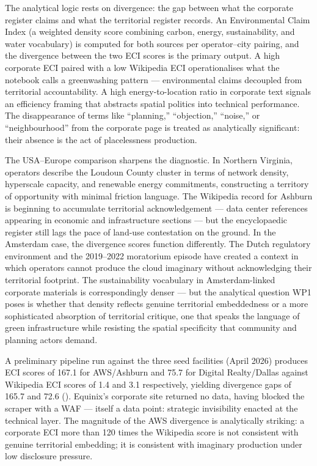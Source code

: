 The analytical logic rests on divergence: the gap between what the corporate register claims and what the territorial register records. An Environmental Claim Index (a weighted density score combining carbon, energy, sustainability, and water vocabulary) is computed for both sources per operator–city pairing, and the divergence between the two ECI scores is the primary output. A high corporate ECI paired with a low Wikipedia ECI operationalises what the notebook calls a greenwashing pattern — environmental claims decoupled from territorial accountability. A high energy-to-location ratio in corporate text signals an efficiency framing that abstracts spatial politics into technical performance. The disappearance of terms like ``planning,'' ``objection,'' ``noise,'' or ``neighbourhood'' from the corporate page is treated as analytically significant: their absence is the act of placelessness production.

The USA--Europe comparison sharpens the diagnostic. In Northern Virginia, operators describe the Loudoun County cluster in terms of network density, hyperscale capacity, and renewable energy commitments, constructing a territory of opportunity with minimal friction language. The Wikipedia record for Ashburn is beginning to accumulate territorial acknowledgement — data center references appearing in economic and infrastructure sections — but the encyclopaedic register still lags the pace of land-use contestation on the ground. In the Amsterdam case, the divergence scores function differently. The Dutch regulatory environment and the 2019--2022 moratorium episode have created a context in which operators cannot produce the cloud imaginary without acknowledging their territorial footprint. The sustainability vocabulary in Amsterdam-linked corporate materials is correspondingly denser — but the analytical question WP1 poses is whether that density reflects genuine territorial embeddedness or a more sophisticated absorption of territorial critique, one that speaks the language of green infrastructure while resisting the spatial specificity that community and planning actors demand.

A preliminary pipeline run against the three seed facilities (April 2026) produces ECI scores of 167.1 for AWS/Ashburn and 75.7 for Digital Realty/Dallas against Wikipedia ECI scores of 1.4 and 3.1 respectively, yielding divergence gaps of 165.7 and 72.6 (). Equinix's corporate site returned no data, having blocked the scraper with a WAF --- itself a data point: strategic invisibility enacted at the technical layer. The magnitude of the AWS divergence is analytically striking: a corporate ECI more than 120 times the Wikipedia score is not consistent with genuine territorial embedding; it is consistent with imaginary production under low disclosure pressure.


